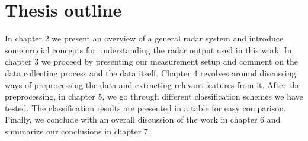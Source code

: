 \section{Thesis outline}

In chapter 2 we present an overview of a general radar system and introduce some crucial concepts for understanding the radar output used in this work. In chapter 3 we proceed by presenting our measurement setup and comment on the data collecting process and the data itself. Chapter 4 revolves around discussing ways of preprocessing the data and extracting relevant features from it. After the preprocessing, in chapter 5, we go through different classification schemes we have tested. The classification results are presented in a table for easy comparison. Finally, we conclude with an overall discussion of the work in chapter 6 and summarize our conclusions in chapter 7.





